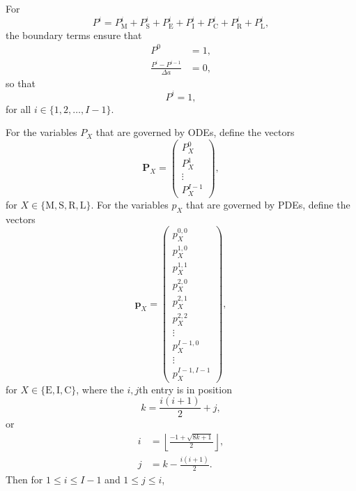 \documentclass[12pt]{article}
\renewcommand{\vec}[1]{\mathbf{#1}}
\begin{document}
For
\begin{equation}
  P^i = P_{\mathrm{M}}^i + P_{\mathrm{S}}^i + P_{\mathrm{E}}^i
  + P_{\mathrm{I}}^i + P_{\mathrm{C}}^i + P_{\mathrm{R}}^i
  + P_{\mathrm{L}}^i,
\end{equation}
the boundary terms ensure that
\begin{align}
  P^0 &= 1,
  \\
  \frac{P^i - P^{i - 1}}{\Delta a} &= 0,
\end{align}
so that
\begin{equation}
  P^i = 1,
\end{equation}
for all $i \in \{1, 2, \ldots, I - 1\}$.

For the variables $P_X$ that are governed by ODEs,
define the vectors
\begin{equation}
  \vec{P}_X =
  \begin{pmatrix}
    P_X^0\\
    P_X^1\\
    \vdots\\
    P_X^{I - 1}
  \end{pmatrix},
\end{equation}
for $X \in \{\mathrm{M}, \mathrm{S}, \mathrm{R}, \mathrm{L}\}$.
For the variables $p_X$ that are governed by PDEs,
define the vectors
\begin{equation}
  \vec{p}_X =
  \begin{pmatrix}
    p_X^{0, 0}\\
    p_X^{1, 0}\\
    p_X^{1, 1}\\
    p_X^{2, 0}\\
    p_X^{2, 1}\\
    p_X^{2, 2}\\
    \vdots\\
    p_X^{I - 1, 0}\\
    \vdots\\
    p_X^{I - 1, I - 1}
  \end{pmatrix},
\end{equation}
for $X \in \{\mathrm{E}, \mathrm{I}, \mathrm{C}\}$,
where the $i, j$th entry is in position
\begin{equation}
  k = \frac{i (i + 1)}{2} + j,
\end{equation}
or
\begin{align}
  i &= \left\lfloor\frac{- 1 + \sqrt{8 k + 1}}{2}\right\rfloor,
  \\
  j &= k - \frac{i (i + 1)}{2}.
\end{align}
Then for $1 \leq i \leq I - 1$ and $1 \leq j \leq i$,
\end{document}
